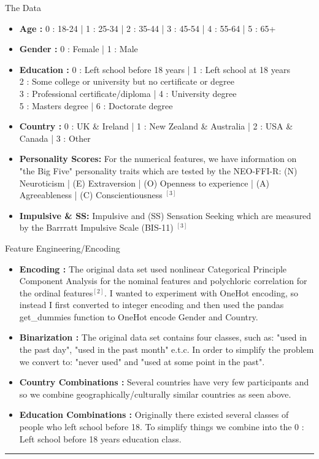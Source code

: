 \documentclass[6pt, final, xcolor=table]{beamer}
\newlength{\colwidth}
\begin{document}
\begin{frame}[t]
\begin{columns}[t]
\begin{column}{\colwidth}
\begin{block}{The Data}
    \begin{itemize}
 \item \textbf{Age : } 0 : 18-24 | 1 : 25-34 | 2 : 35-44 | 3 : 45-54 | 4 : 55-64 | 5 : 65+
 \item \textbf{Gender : } 0 : Female | 1 : Male
 \item \textbf{Education : } 0 : Left school before 18 years 
 |  1 : Left school at 18 years \\
  2 : Some college or university but no certificate or degree \\
  3 : Professional certificate/diploma | 4 : University degree \\
  5 : Masters degree | 6 : Doctorate degree
 \item \textbf{Country : } 0 : UK \& Ireland | 1 : New Zealand \& Australia | 2 : USA \& Canada | 3 : Other \\
 \item \textbf{Personality Scores: } For the numerical features, we have information on "the Big Five" personality traits which
 are tested by the NEO-FFI-R: (N) Neuroticism | (E) Extraversion | (O) Openness to experience | (A) Agreeableness | (C) Conscientiousness $^{[3]}$
 \item \textbf{Impulsive \& SS: } Impulsive and (SS) Sensation Seeking which are measured by the Barrratt Impulsive Scale (BIS-11) $^{[3]}$
 \end{itemize}
 

  \end{block}

  \begin{block}{Feature Engineering/Encoding}
 \begin{itemize}
     \item \textbf{Encoding :} The original data set used nonlinear Categorical Principle Component Analysis for the nominal features and polychloric correlation for the ordinal features$^{[2]}$. I wanted to experiment with OneHot encoding, so instead I first converted to integer encoding and then used the pandas get\_dummies function to OneHot encode Gender and Country.  
  \item \textbf{Binarization :} The original data set contains four classes, such as: "used in the past day", "used in the past month" e.t.c. In order to simplify the problem
 we convert to: "never used" and "used at some point in the past".
  \item \textbf{Country Combinations :} Several countries have very few participants and so
  we combine geographically/culturally similar countries as seen above.
  \item \textbf{Education Combinations :} Originally there existed several classes of people who left school before 18. To simplify things we combine into the 0 : Left school before 18 years education class.
 \end{itemize}
\hrule
\vspace{2mm}


\end{block}
\end{column}
\end{columns}
\end{frame}
\end{document}

